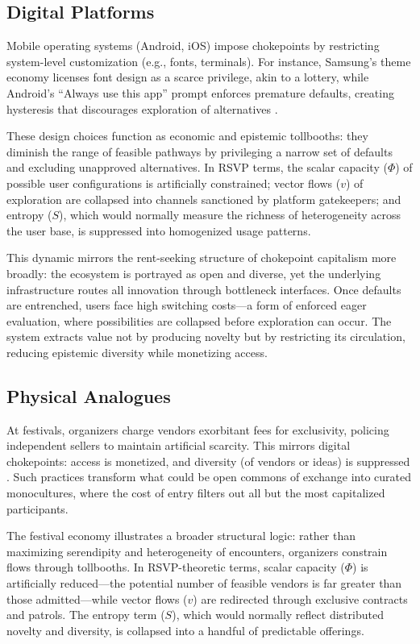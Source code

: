 \documentclass[12pt]{article}
\theoremstyle{remark}
\begin{document}
\subsection{Digital Platforms}
Mobile operating systems (Android, iOS) impose chokepoints by restricting system-level customization (e.g., fonts, terminals). 
For instance, Samsung’s theme economy licenses font design as a scarce privilege, akin to a lottery, while Android’s ``Always use this app'' 
prompt enforces premature defaults, creating hysteresis that discourages exploration of alternatives \citep{doctorow2020lockin}. 

These design choices function as economic and epistemic tollbooths: they diminish the range of feasible pathways by privileging 
a narrow set of defaults and excluding unapproved alternatives. In RSVP terms, the scalar capacity ($\Phi$) of possible user 
configurations is artificially constrained; vector flows ($v$) of exploration are collapsed into channels sanctioned by 
platform gatekeepers; and entropy ($S$), which would normally measure the richness of heterogeneity across the user base, 
is suppressed into homogenized usage patterns. 

This dynamic mirrors the rent-seeking structure of chokepoint capitalism more broadly: the ecosystem is portrayed as open 
and diverse, yet the underlying infrastructure routes all innovation through bottleneck interfaces. Once defaults are entrenched, 
users face high switching costs---a form of enforced eager evaluation, where possibilities are collapsed before exploration can occur. 
The system extracts value not by producing novelty but by restricting its circulation, reducing epistemic diversity while monetizing access.


\subsection{Physical Analogues}
At festivals, organizers charge vendors exorbitant fees for exclusivity, policing independent sellers to maintain artificial scarcity. 
This mirrors digital chokepoints: access is monetized, and diversity (of vendors or ideas) is suppressed \citep{giblin2022chokepoint}. 
Such practices transform what could be open commons of exchange into curated monocultures, where the cost of entry filters out 
all but the most capitalized participants. 

The festival economy illustrates a broader structural logic: rather than maximizing serendipity and heterogeneity of encounters, 
organizers constrain flows through tollbooths. In RSVP-theoretic terms, scalar capacity ($\Phi$) is artificially reduced---the 
potential number of feasible vendors is far greater than those admitted---while vector flows ($v$) are redirected through 
exclusive contracts and patrols. The entropy term ($S$), which would normally reflect distributed novelty and diversity, 
is collapsed into a handful of predictable offerings. 
\end{document}

